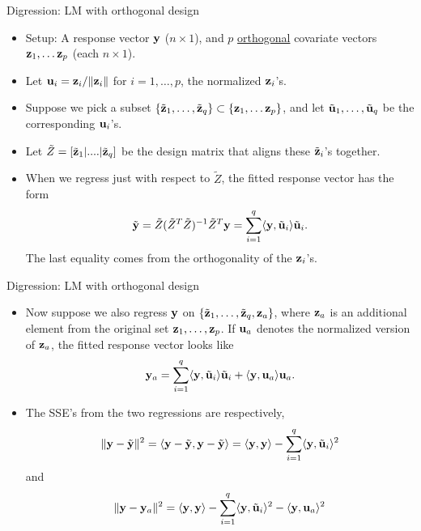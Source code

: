 \documentclass{beamer}
\newenvironment{wideitemize}%
  {\begin{itemize}%
    \setlength{\parskip}{1em}}%
  {\end{itemize}}
\begin{document}
\begin{frame} {Digression: LM with orthogonal design}
\begin{itemize}

\item Setup: A response vector ${\bf y}$ ($n \times 1$), and  $p$ \underline{orthogonal} covariate vectors ${\bf z}_1, \dots {\bf z}_p$ (each $n \times 1$).

\item  Let ${\bf u}_i = {\bf z}_i /\|{\bf z}_i\|$ for $i =1, \dots, p$, the normalized ${\bf z}_i$'s. 

\item Suppose we  pick a subset  $\{\tilde{\bf z}_1, \dots, \tilde{\bf z}_q\} \subset \{{\bf z}_1, \dots {\bf z}_p\}$, and let $\tilde{\bf u}_1, \dots, \tilde{\bf u}_q$ be the corresponding  ${\bf u}_i$'s. 


\item Let $\tilde{Z} = [\tilde{\bf z}_1 | ....|\tilde{\bf z}_q ]$ be the design matrix that aligns these $\tilde{\bf z}_i$'s together. 

\item When we regress just with respect to  $\tilde{Z}$,  the fitted response vector has the form 
\[
\tilde{\bf y} =\tilde{Z} (\tilde{Z}^T \tilde{Z})^{-1}\tilde{Z}^T {\bf y} = \sum_{i = 1}^q  \langle {\bf y} , \tilde{\bf u}_i \rangle\tilde{\bf u}_i.\]
 The last equality comes from the orthogonality of the ${\bf z}_i$'s. 
\end{itemize}


\end{frame}


\begin{frame} {Digression: LM with orthogonal design}
\begin{wideitemize}
\item Now suppose we also regress $\bf y$ on $\{\tilde{\bf z}_1, \dots, \tilde{\bf z}_q, {\bf z}_a\}$, where ${\bf z}_a$ is an additional element from the original set ${\bf z}_1, \dots, {\bf z}_p$. If  ${\bf u}_a$ denotes the normalized version of ${\bf z}_a$, the fitted response vector looks like
\[
{\bf y}_a = \sum_{i= 1}^q \langle {\bf y} , \tilde{\bf u}_i\rangle\tilde{\bf u}_i + \langle {\bf y} , {\bf u}_a\rangle{\bf u}_a.
\]

\item The SSE's from the two regressions are respectively, 
 \[\| {\bf y}- \tilde{\bf y}\|^2 = \langle  {\bf y} - \tilde{\bf y} , {\bf y}- \tilde{\bf y}\rangle = \langle {\bf y}, {\bf y}\rangle - \sum_{i = 1}^q \langle {\bf y} , \tilde{\bf u}_i  \rangle^2 \]
and
\[
\| {\bf y}- {\bf y}_a\|^2  =  \langle {\bf y}, {\bf y}\rangle - \sum_{i = 1}^q \langle {\bf y} , \tilde{\bf u}_i  \rangle^2 - \langle {\bf y}, {\bf u}_a\rangle^2
\]

\end{wideitemize}

\end{frame}
\end{document}
